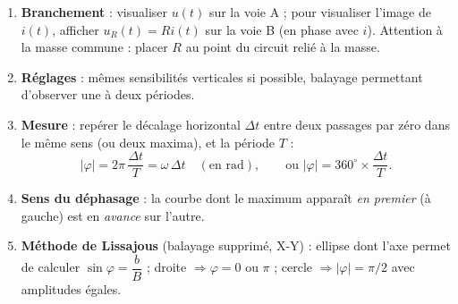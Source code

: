 \documentclass[11pt]{article}
\begin{document}
\begin{methode}
\begin{enumerate}
\item \textbf{Branchement} : visualiser $u(t)$ sur la voie A ; pour visualiser l'image de $i(t)$, afficher $u_R(t) = Ri(t)$ sur la voie B (en phase avec $i$). Attention à la masse commune : placer $R$ au point du circuit relié à la masse.
\item \textbf{Réglages} : mêmes sensibilités verticales si possible, balayage permettant d'observer une à deux périodes.
\item \textbf{Mesure} : repérer le décalage horizontal $\Delta t$ entre deux passages par zéro dans le même sens (ou deux maxima), et la période $T$ :
\[ |\varphi| = 2\pi\,\dfrac{\Delta t}{T} = \omega\,\Delta t \quad (\text{en rad}), \qquad \text{ou } |\varphi| = 360^{\circ}\times\dfrac{\Delta t}{T}. \]
\item \textbf{Sens du déphasage} : la courbe dont le maximum apparaît \emph{en premier} (à gauche) est en \emph{avance} sur l'autre.
\item \textbf{Méthode de Lissajous} (balayage supprimé, X-Y) : ellipse dont l'axe permet de calculer $\sin\varphi = \dfrac{b}{B}$ ; droite $\Rightarrow \varphi = 0$ ou $\pi$ ; cercle $\Rightarrow |\varphi| = \pi/2$ avec amplitudes égales.
\end{enumerate}
\end{methode}
\end{document}
